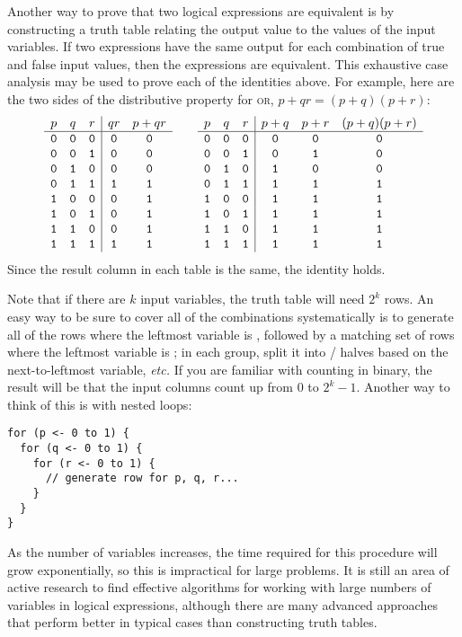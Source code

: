 Another way to prove that two logical expressions are equivalent is by constructing a truth table relating the output value to the values of the input variables. If two expressions have the same output for each combination of true and false input values, then the expressions are equivalent. This exhaustive case analysis may be used to prove each of the identities above. For example, here are the two sides of the distributive property for \textsc{or}, $p+qr = (p+q)(p+r)$:
\[ \begin{array}{ccc|cc}
p  & q  & r  & qr & p+qr\\ \hline
\mathtt{0} & \mathtt{0} & \mathtt{0} & \mathtt{0} & \mathtt{0}\\
\mathtt{0} & \mathtt{0} & \mathtt{1} & \mathtt{0} & \mathtt{0}\\
\mathtt{0} & \mathtt{1} & \mathtt{0} & \mathtt{0} & \mathtt{0}\\
\mathtt{0} & \mathtt{1} & \mathtt{1} & \mathtt{1} & \mathtt{1}\\
\mathtt{1} & \mathtt{0} & \mathtt{0} & \mathtt{0} & \mathtt{1}\\
\mathtt{1} & \mathtt{0} & \mathtt{1} & \mathtt{0} & \mathtt{1}\\
\mathtt{1} & \mathtt{1} & \mathtt{0} & \mathtt{0} & \mathtt{1}\\
\mathtt{1} & \mathtt{1} & \mathtt{1} & \mathtt{1} & \mathtt{1}
\end{array}\qquad
\begin{array}{ccc|ccc}
p  & q  & r  & p+q & p+r & (p+q)(p+r)\\ \hline
\mathtt{0} & \mathtt{0} & \mathtt{0} & \mathtt{0}  & \mathtt{0}  & \mathtt{0}\\
\mathtt{0} & \mathtt{0} & \mathtt{1} & \mathtt{0}  & \mathtt{1}  & \mathtt{0}\\
\mathtt{0} & \mathtt{1} & \mathtt{0} & \mathtt{1}  & \mathtt{0}  & \mathtt{0}\\
\mathtt{0} & \mathtt{1} & \mathtt{1} & \mathtt{1}  & \mathtt{1}  & \mathtt{1}\\
\mathtt{1} & \mathtt{0} & \mathtt{0} & \mathtt{1}  & \mathtt{1}  & \mathtt{1}\\
\mathtt{1} & \mathtt{0} & \mathtt{1} & \mathtt{1}  & \mathtt{1}  & \mathtt{1}\\
\mathtt{1} & \mathtt{1} & \mathtt{0} & \mathtt{1}  & \mathtt{1}  & \mathtt{1}\\
\mathtt{1} & \mathtt{1} & \mathtt{1} & \mathtt{1}  & \mathtt{1}  & \mathtt{1}
\end{array} \]
Since the result column in each table is the same, the identity holds.

Note that if there are $k$ input variables, the truth table will need $2^k$ rows. An easy way to be sure to cover all of the combinations systematically is to generate all of the rows where the leftmost variable is \0, followed by a matching set of rows where the leftmost variable is \1; in each group, split it into \0/\1 halves based on the next-to-leftmost variable, \textit{etc.} If you are familiar with counting in binary, the result will be that the input columns count up from $0$ to $2^k-1$. Another way to think of this is with nested loops:
\begin{verbatim}
for (p <- 0 to 1) {
  for (q <- 0 to 1) {
    for (r <- 0 to 1) {
      // generate row for p, q, r...
    }
  }
}
\end{verbatim}
As the number of variables increases, the time required for this procedure will grow exponentially, so this is impractical for large problems. It is still an area of active research to find effective algorithms for working with large numbers of variables in logical expressions, although there are many advanced approaches that perform better in typical cases than constructing truth tables.

